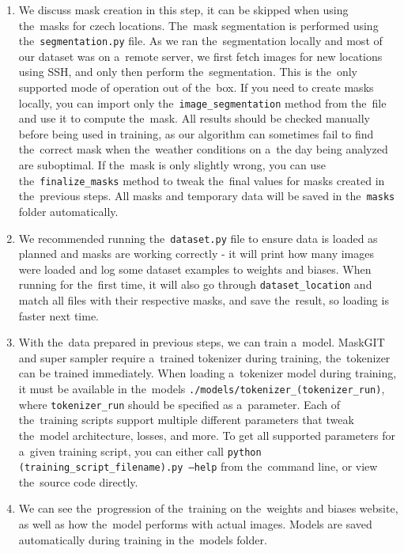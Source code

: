 \begin{enumerate}
    \item We discuss mask creation in this step, it can be skipped when using the~masks for czech locations. The~mask segmentation is performed using the~\texttt{segmentation.py} file. As we ran the~segmentation locally and most of our dataset was on a~remote server, we first fetch images for new locations using SSH, and only then perform the~segmentation. This is the~only supported mode of operation out of the~box. If you need to create masks locally, you can import only the~\texttt{image\_segmentation} method from the~file and use it to compute the~mask. All results should be checked manually before being used in training, as our algorithm can sometimes fail to find the~correct mask when the~weather conditions on a~the day being analyzed are suboptimal. If the~mask is only slightly wrong, you can use the~\texttt{finalize\_masks} method to tweak the~final values for masks created in the~previous steps. All masks and temporary data will be saved in the~\texttt{masks} folder automatically.
    
    \item We recommended running the~\texttt{dataset.py} file to ensure data is loaded as planned and masks are working correctly - it will print how many images were loaded and log some dataset examples to weights and biases. When running for the~first time, it will also go through \texttt{dataset\_location} and match all files with their respective masks, and save the~result, so loading is faster next time.

    \item With the~data prepared in previous steps, we can train a~model. MaskGIT and super sampler require a~trained tokenizer during training, the~tokenizer can be trained immediately. When loading a~tokenizer model during training, it must be available in the~models  \texttt{./models/tokenizer\_(tokenizer\_run)}, where \texttt{tokenizer\_run} should be specified as a~parameter. Each of the~training scripts support multiple different parameters that tweak the~model architecture, losses, and more. To get all supported parameters for a~given training script, you can either call \texttt{python (training\_script\_filename).py --help} from the~command line, or view the~source code directly.

    \item We can see the~progression of the~training on the~weights and biases website, as well as how the~model performs with actual images. Models are saved automatically during training in the~models folder.

\end{enumerate}

